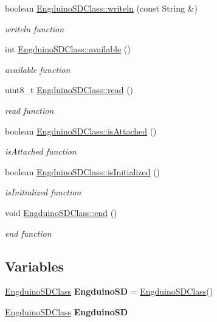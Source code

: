 \begin{DoxyCompactItemize}
boolean \hyperlink{group___engduino_s_d_ga63ef24253f224cd4d99ac47fac745c7f}{Engduino\+S\+D\+Class\+::writeln} (const String \&)
\begin{DoxyCompactList}\small\item\em writeln function \end{DoxyCompactList}\item 
int \hyperlink{group___engduino_s_d_gae3d19c36792ef53fe572e763a77a93e5}{Engduino\+S\+D\+Class\+::available} ()
\begin{DoxyCompactList}\small\item\em available function \end{DoxyCompactList}\item 
uint8\+\_\+t \hyperlink{group___engduino_s_d_ga7c333386f94dfd88ef309a685a7fa3db}{Engduino\+S\+D\+Class\+::read} ()
\begin{DoxyCompactList}\small\item\em read function \end{DoxyCompactList}\item 
boolean \hyperlink{group___engduino_s_d_ga700248981ca6e35f9d9c3b6ea71ae8c2}{Engduino\+S\+D\+Class\+::is\+Attached} ()
\begin{DoxyCompactList}\small\item\em is\+Attached function \end{DoxyCompactList}\item 
boolean \hyperlink{group___engduino_s_d_gaea10bd485fc67e6e44b96c12036098b5}{Engduino\+S\+D\+Class\+::is\+Initialized} ()
\begin{DoxyCompactList}\small\item\em is\+Initialized function \end{DoxyCompactList}\item 
void \hyperlink{group___engduino_s_d_gac381fbc074cacbada62e9bfac3470e26}{Engduino\+S\+D\+Class\+::end} ()
\begin{DoxyCompactList}\small\item\em end function \end{DoxyCompactList}\end{DoxyCompactItemize}
\subsection*{Variables}
\begin{DoxyCompactItemize}
\item 
\hypertarget{group___engduino_s_d_ga504e9c789dec193099b514258fab3401}{}\hyperlink{class_engduino_s_d_class}{Engduino\+S\+D\+Class} {\bfseries Engduino\+S\+D} = \hyperlink{class_engduino_s_d_class}{Engduino\+S\+D\+Class}()\label{group___engduino_s_d_ga504e9c789dec193099b514258fab3401}

\item 
\hypertarget{group___engduino_s_d_ga504e9c789dec193099b514258fab3401}{}\hyperlink{class_engduino_s_d_class}{Engduino\+S\+D\+Class} {\bfseries Engduino\+S\+D}\label{group___engduino_s_d_ga504e9c789dec193099b514258fab3401}

\end{DoxyCompactItemize}


